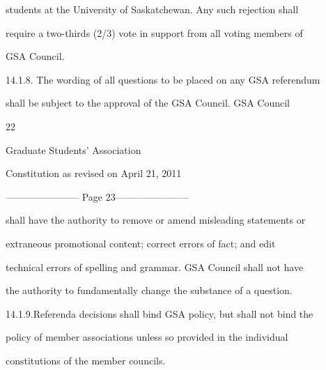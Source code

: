 \documentclass{article}
\begin{document}
students  at the  University of  Saskatchewan. Any  such  rejection shall  

require a two-thirds (2/3) vote in support from all voting members of  

GSA Council.  



14.1.8.     The wording of all questions to be placed on any GSA referendum  

shall  be  subject  to  the  approval  of  the  GSA  Council.  GSA  Council  



     22  



       Graduate Students’ Association  



  Constitution as revised on April 21, 2011  


----------------------- Page 23-----------------------

  shall have the authority to remove or amend misleading statements or  

  extraneous   promotional   content;   correct   errors   of   fact;   and   edit  

  technical errors of spelling and grammar.  GSA  Council shall not have  

  the authority to fundamentally change the substance of a question.  



14.1.9.Referenda decisions shall bind GSA policy, but shall not bind the  

  policy  of  member  associations  unless  so  provided  in  the  individual  

  constitutions of the member councils.  
\end{document}
